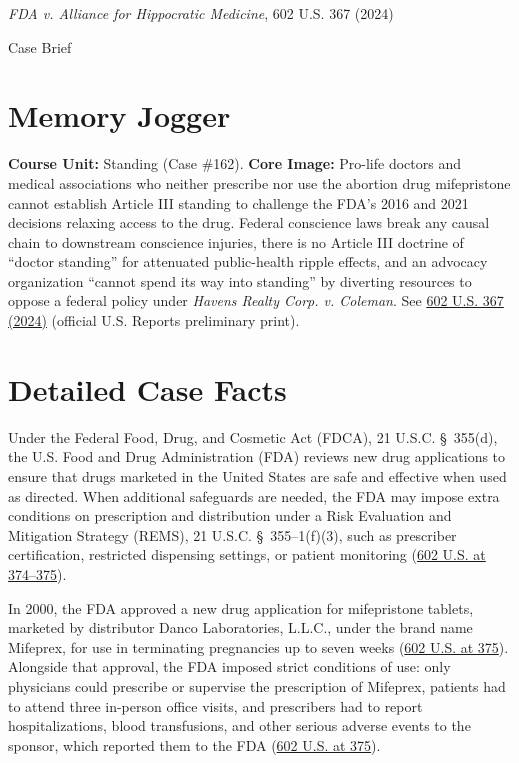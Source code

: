 \documentclass[12pt]{article}
\begin{document}
\begin{center}
{\LARGE \textit{FDA v. Alliance for Hippocratic Medicine}, 602 U.S. 367 (2024)\par}
\vspace{0.8em}
{\large Case Brief\par}
\end{center}
\vspace{1em}

\section{Memory Jogger}

\textbf{Course Unit:} Standing (Case \#162). \textbf{Core Image:} Pro-life doctors and medical associations who neither prescribe nor use the abortion drug mifepristone cannot establish Article III standing to challenge the FDA's 2016 and 2021 decisions relaxing access to the drug. Federal conscience laws break any causal chain to downstream conscience injuries, there is no Article III doctrine of ``doctor standing'' for attenuated public-health ripple effects, and an advocacy organization ``cannot spend its way into standing'' by diverting resources to oppose a federal policy under \textit{Havens Realty Corp. v. Coleman}. See \href{https://www.supremecourt.gov/opinions/23pdf/602us1r35_bqmd.pdf}{602 U.S. 367 (2024)} (official U.S. Reports preliminary print).

\section{Detailed Case Facts}

Under the Federal Food, Drug, and Cosmetic Act (FDCA), 21 U.S.C. \S~355(d), the U.S. Food and Drug Administration (FDA) reviews new drug applications to ensure that drugs marketed in the United States are safe and effective when used as directed. When additional safeguards are needed, the FDA may impose extra conditions on prescription and distribution under a Risk Evaluation and Mitigation Strategy (REMS), 21 U.S.C. \S~355--1(f)(3), such as prescriber certification, restricted dispensing settings, or patient monitoring (\href{https://www.supremecourt.gov/opinions/23pdf/602us1r35_bqmd.pdf}{602 U.S. at 374--375}).

In 2000, the FDA approved a new drug application for mifepristone tablets, marketed by distributor Danco Laboratories, L.L.C., under the brand name Mifeprex, for use in terminating pregnancies up to seven weeks (\href{https://www.supremecourt.gov/opinions/23pdf/602us1r35_bqmd.pdf}{602 U.S. at 375}). Alongside that approval, the FDA imposed strict conditions of use: only physicians could prescribe or supervise the prescription of Mifeprex, patients had to attend three in-person office visits, and prescribers had to report hospitalizations, blood transfusions, and other serious adverse events to the sponsor, which reported them to the FDA (\href{https://www.supremecourt.gov/opinions/23pdf/602us1r35_bqmd.pdf}{602 U.S. at 375}).
\end{document}

